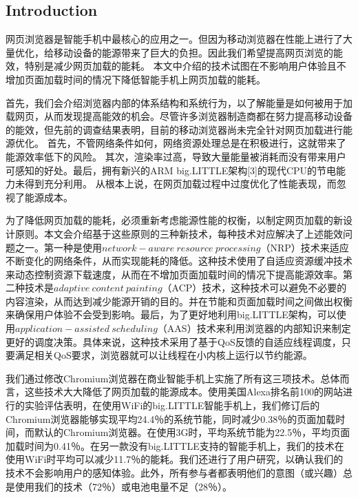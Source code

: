 \documentclass[sigconf]{acmart}
\begin{document}
\begin{CJK}{UTF8}{song}



\maketitle

\section{Introduction}

网页浏览器是智能手机中最核心的应用之一。但因为移动浏览器在性能上进行了大量优化，给移动设备的能源带来了巨大的负担。因此我们希望提高网页浏览的能效，特别是减少网页加载的能耗。 本文中介绍的技术试图在不影响用户体验且不增加页面加载时间的情况下降低智能手机上网页加载的能耗。

首先，我们会介绍浏览器内部的体系结构和系统行为，以了解能量是如何被用于加载网页，从而发现提高能效的机会。尽管许多浏览器制造商都在努力提高移动设备的能效，但先前的调查结果表明，目前的移动浏览器尚未完全针对网页加载进行能源优化。 首先，不管网络条件如何，网络资源处理总是在积极进行，这就带来了能源效率低下的风险。 其次，渲染率过高，导致大量能量被消耗而没有带来用户可感知的好处。最后，拥有新兴的ARM big.LITTLE架构[3]的现代CPU的节电能力未得到充分利用。 从根本上说，在网页加载过程中过度优化了性能表现，而忽视了能源成本。

为了降低网页加载的能耗，必须重新考虑能源性能的权衡，以制定网页加载的新设计原则。本文会介绍基于这些原则的三种新技术，每种技术对应解决了上述能效问题之一。第一种是使用$network-aware\ resource\ processing$（NRP）技术来适应不断变化的网络条件，从而实现能耗的降低。这种技术使用了自适应资源缓冲技术来动态控制资源下载速度，从而在不增加页面加载时间的情况下提高能源效率。第二种技术是$adaptive\ content\ painting$（ACP）技术，这种技术可以避免不必要的内容渲染，从而达到减少能源开销的目的。并在节能和页面加载时间之间做出权衡来确保用户体验不会受到影响。最后，为了更好地利用big.LITTLE架构，可以使用$application-assisted\ scheduling$（AAS）技术来利用浏览器的内部知识来制定更好的调度决策。具体来说，这种技术采用了基于QoS反馈的自适应线程调度，只要满足相关QoS要求，浏览器就可以让线程在小内核上运行以节约能源。

我们通过修改Chromium浏览器在商业智能手机上实施了所有这三项技术。总体而言，这些技术大大降低了网页加载的能源成本。使用美国Alexa排名前100的网站进行的实验评估表明，在使用WiFi的big.LITTLE智能手机上，我们修订后的Chromium浏览器能够实现平均24.4％的系统节能，同时减少0.38％的页面加载时间，而默认的Chromium浏览器。在使用3G时，平均系统节能为22.5％，平均页面加载时间为0.41％。在另一款没有big.LITTLE支持的智能手机上，我们的技术在使用WiFi时平均可以减少11.7％的能耗。我们还进行了用户研究，以确认我们的技术不会影响用户的感知体验。此外，所有参与者都表明他们的意图（或兴趣）总是使用我们的技术（72％）或电池电量不足（28％）。


\end{CJK}
\end{document}
